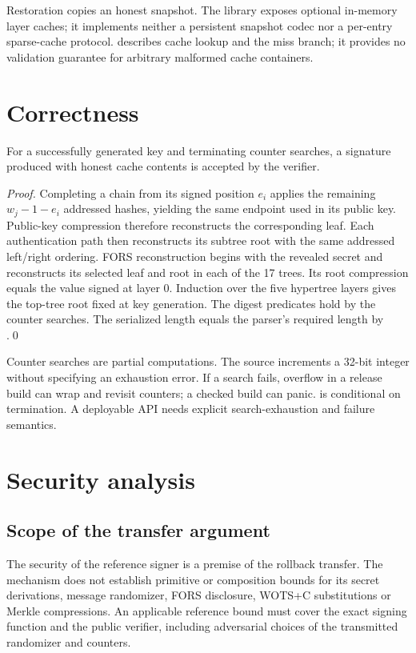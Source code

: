 \documentclass[a4paper,envcountsame,runningheads]{llncs}
\begin{document}
Restoration copies an honest snapshot. The library exposes optional in-memory layer caches; it implements neither a persistent snapshot codec nor a per-entry sparse-cache protocol.  describes cache lookup and the miss branch; it provides no validation guarantee for arbitrary malformed cache containers.

\section{Correctness}\label{sec:correctness}
\begin{lemma}\label{lem:correct}
For a successfully generated key and terminating counter searches, a signature produced with honest cache contents is accepted by the verifier.
\end{lemma}
\begin{proof}
Completing a chain from its signed position $e_i$ applies the remaining $w_j-1-e_i$ addressed hashes, yielding the same endpoint used in its public key. Public-key compression therefore reconstructs the corresponding leaf. Each authentication path then reconstructs its subtree root with the same addressed left/right ordering. FORS reconstruction begins with the revealed secret and reconstructs its selected leaf and root in each of the 17 trees. Its root compression equals the value signed at layer 0. Induction over the five hypertree layers gives the top-tree root fixed at key generation. The digest predicates hold by the counter searches. The serialized length equals the parser's required length by .\qed
\end{proof}

Counter searches are partial computations. The source increments a 32-bit integer without specifying an exhaustion error. If a search fails, overflow in a release build can wrap and revisit counters; a checked build can panic.  is conditional on termination. A deployable API needs explicit search-exhaustion and failure semantics.

\section{Security analysis}\label{sec:security}
\subsection{Scope of the transfer argument}
The security of the reference signer is a premise of the rollback transfer. The mechanism does not establish primitive or composition bounds for its secret derivations, message randomizer, FORS disclosure, WOTS+C substitutions or Merkle compressions. An applicable reference bound must cover the exact signing function and the public verifier, including adversarial choices of the transmitted randomizer and counters.
\end{document}
